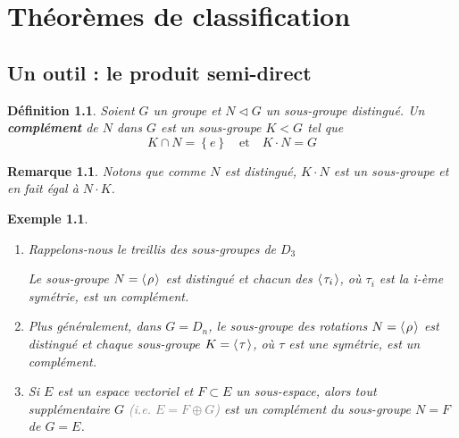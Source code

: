 \documentclass[a4paper, oneside]{report}
\theoremstyle{break}
\newtheorem{definition}[thm]{Définition}
\newtheorem{exemple}[thm]{Exemple}
\newtheorem{remarque}[thm]{Remarque}
\newcommand{\gray}[1]{\textcolor{gray}{#1}}
\DeclarePairedDelimiter\ens{\left\{ }{\right\} }%
\renewcommand{\ens}[1]{\left\{ #1 \right\} }%
\newcommand{\pro}[1]{\langle\hspace{0.1em}#1\hspace{0.1em}\rangle}
\newcommand{\slign}{\textbf}
\newcommand{\gen}{\pro}
\begin{document}
\chapter{Théorèmes de classification}

\section{Un outil : le produit semi-direct}

\begin{definition}
Soient $G$ un groupe et $N \triangleleft G$ un sous-groupe distingué. Un \slign{complément} de $N$ dans $G$ est un sous-groupe $K < G$ tel que
\[
K \cap N = \ens{e}		\quad	\text{et}	\quad	K \cdot N = G
\]
\end{definition}

\begin{remarque}
Notons que comme $N$ est distingué, $K \cdot N$ est un sous-groupe et en fait
égal à $N\cdot K$.
\end{remarque}

\begin{exemple}
\begin{enumerate}
\item Rappelons-nous le treillis des sous-groupes de $D_3$\\

\begin{center}
\end{center}


Le sous-groupe $N = \gen{\rho}$ est distingué et chacun des $\gen{\tau_i}$, où $\tau_i$ est la i-ème symétrie, est un complément.

\medbreak

\item Plus généralement, dans $G = D_n$, le sous-groupe des rotations $N = \gen{\rho} $ est distingué et chaque sous-groupe $K = \gen{\tau}$, où $\tau$ est une symétrie, est un complément.

\medbreak

\item  Si $E$ est un espace vectoriel et $F \subset E$ un sous-espace, alors tout supplémentaire $G$ \gray{(i.e. $E = F \oplus G$)} est un complément du sous-groupe $N = F$ de $G = E$.

\end{enumerate}
\end{exemple}
\end{document}
